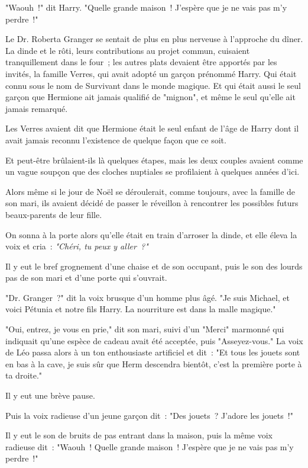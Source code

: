 "Waouh~!" dit Harry. "Quelle grande maison~! J'espère que je ne vais pas m'y perdre~!"

\later

Le Dr. Roberta Granger se sentait de plus en plus nerveuse à l'approche du dîner. La dinde et le rôti, leurs contributions au projet commun, cuisaient tranquillement dans le four~; les autres plats devaient être apportés par les invités, la famille Verres, qui avait adopté un garçon prénommé Harry. Qui était connu sous le nom de Survivant dans le monde magique. Et qui était aussi le seul garçon que Hermione ait jamais qualifié de "mignon", et même le seul qu'elle ait jamais remarqué.

Les Verres avaient dit que Hermione était le seul enfant de l'âge de Harry dont il avait jamais reconnu l'existence de quelque façon que ce soit.

Et peut-être brûlaient-ils là quelques étapes, mais les deux couples avaient comme un vague soupçon que des cloches nuptiales se profilaient à quelques années d'ici.

Alors même si le jour de Noël se déroulerait, comme toujours, avec la famille de son mari, ils avaient décidé de passer le réveillon à rencontrer les possibles futurs beaux-parents de leur fille.

On sonna à la porte alors qu'elle était en train d'arroser la dinde, et elle éleva la voix et cria~: \emph{"Chéri, tu peux y aller~?"}

Il y eut le bref grognement d'une chaise et de son occupant, puis le son des lourds pas de son mari et d'une porte qui s'ouvrait.

"Dr. Granger~?" dit la voix brusque d'un homme plus âgé. "Je suis Michael, et voici Pétunia et notre fils Harry. La nourriture est dans la malle magique."

"Oui, entrez, je vous en prie," dit son mari, suivi d'un "Merci" marmonné qui indiquait qu'une espèce de cadeau avait été acceptée, puis "Asseyez-vous." La voix de Léo passa alors à un ton enthousiaste artificiel et dit~: "Et tous les jouets sont en bas à la cave, je suis sûr que Herm descendra bientôt, c'est la première porte à ta droite."

Il y eut une brève pause.

Puis la voix radieuse d'un jeune garçon dit~: "Des jouets~? J'adore les jouets~!"

Il y eut le son de bruits de pas entrant dans la maison, puis la même voix radieuse dit~: "Waouh~! Quelle grande maison~! J'espère que je ne vais pas m'y perdre~!"

